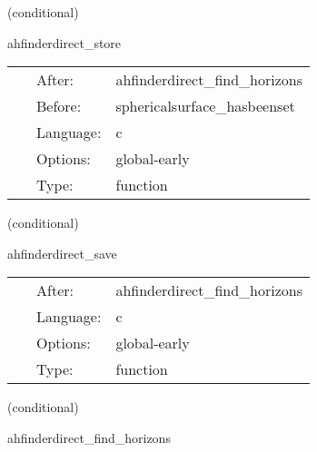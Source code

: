 \vspace{5mm}

   (conditional) 

\hspace{5mm} ahfinderdirect\_store 

\hspace{5mm}{\it store apparent horizon(s) into spherical surface(s) } 


\hspace{5mm}

 \begin{tabular*}{160mm}{cll} 
~ & After:  & ahfinderdirect\_find\_horizons \\ 
~ & Before:  & sphericalsurface\_hasbeenset \\ 
~ & Language:  & c \\ 
~ & Options:  & global-early \\ 
~ & Type:  & function \\ 
\end{tabular*} 


\vspace{5mm}

   (conditional) 

\hspace{5mm} ahfinderdirect\_save 

\hspace{5mm}{\it save apparent horizon(s) into cactus variables } 


\hspace{5mm}

 \begin{tabular*}{160mm}{cll} 
~ & After:  & ahfinderdirect\_find\_horizons \\ 
~ & Language:  & c \\ 
~ & Options:  & global-early \\ 
~ & Type:  & function \\ 
\end{tabular*} 


\vspace{5mm}

   (conditional) 

\hspace{5mm} ahfinderdirect\_find\_horizons 

\hspace{5mm}{\it find apparent horizon(s) after this time step } 


\hspace{5mm}

